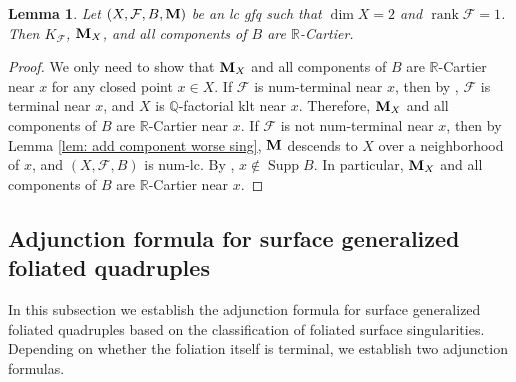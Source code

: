 \documentclass[11pt]{amsart}
\numberwithin{equation}{section}
\newcommand{\Mm}{{\bf{M}}}
\newcommand{\Qq}{\mathbb{Q}}
\newcommand{\Rr}{\mathbb{R}}
\newcommand{\rk}{\operatorname{rank}}
\newcommand{\Supp}{\operatorname{Supp}}
\newcommand{\Ff}{\mathcal{F}}
\newtheorem{lem}[thm]{Lemma}
\theoremstyle{definition}
\theoremstyle{definition}
\theoremstyle{definition}
\begin{document}
\begin{lem}\label{lem: r cartier b m lc gfq}
    Let $(X,\Ff,B,\Mm)$ be an lc gfq such that $\dim X=2$ and $\rk\Ff=1$. Then $K_{\Ff}$, $\Mm_X$, and all components of $B$ are $\Rr$-Cartier.
\end{lem}
\begin{proof}
We only need to show that $\Mm_X$ and all components of $B$ are $\Rr$-Cartier near $x$ for any closed point $x\in X$. If $\Ff$ is num-terminal near $x$, then by \cite[Theorem 3.19]{LMX23a}, $\Ff$ is terminal near $x$, and $X$ is $\Qq$-factorial klt near $x$. Therefore, $\Mm_X$ and all components of $B$ are $\Rr$-Cartier near $x$. If $\Ff$ is not num-terminal near $x$, then by Lemma \ref{lem: add component worse sing}, $\Mm$ descends to $X$ over a neighborhood of $x$, and  $(X,\Ff,B)$ is num-lc. By \cite[Theorem 3.19]{LMX23a}, $x\not\in\Supp B$. In particular, $\Mm_X$ and all components of $B$  are $\Rr$-Cartier near $x$. 
\end{proof}


\subsection{Adjunction formula for surface generalized foliated quadruples}\label{subsec: adj gfq surface} In this subsection we establish the adjunction formula for surface generalized foliated quadruples based on the classification of foliated surface singularities. Depending on whether the foliation itself is terminal, we establish two adjunction formulas.
\end{document}
